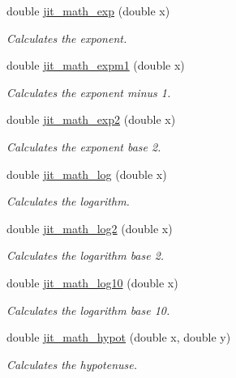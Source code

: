 \begin{DoxyCompactItemize}
double \hyperlink{group__mathmod_ga7bb1ea70eca67afe4c3f4d8581cf45cb}{jit\_\-math\_\-exp} (double x)
\begin{DoxyCompactList}\small\item\em Calculates the exponent. \item\end{DoxyCompactList}\item 
double \hyperlink{group__mathmod_ga580bb63b70c7d65e7bfe2c4125dadacb}{jit\_\-math\_\-expm1} (double x)
\begin{DoxyCompactList}\small\item\em Calculates the exponent minus 1. \item\end{DoxyCompactList}\item 
double \hyperlink{group__mathmod_gafc4e924e75bba7f486c72a1177accb89}{jit\_\-math\_\-exp2} (double x)
\begin{DoxyCompactList}\small\item\em Calculates the exponent base 2. \item\end{DoxyCompactList}\item 
double \hyperlink{group__mathmod_ga6543eb501e50e9b6d4c2f3ef4b22756d}{jit\_\-math\_\-log} (double x)
\begin{DoxyCompactList}\small\item\em Calculates the logarithm. \item\end{DoxyCompactList}\item 
double \hyperlink{group__mathmod_gaf5c2224b71ae0c70dbbf1f16b09ddf21}{jit\_\-math\_\-log2} (double x)
\begin{DoxyCompactList}\small\item\em Calculates the logarithm base 2. \item\end{DoxyCompactList}\item 
double \hyperlink{group__mathmod_ga6927a4753bd0f96341a17cca37e73f88}{jit\_\-math\_\-log10} (double x)
\begin{DoxyCompactList}\small\item\em Calculates the logarithm base 10. \item\end{DoxyCompactList}\item 
double \hyperlink{group__mathmod_ga52b4fbb8dfa64fd3758e22993e7476ca}{jit\_\-math\_\-hypot} (double x, double y)
\begin{DoxyCompactList}\small\item\em Calculates the hypotenuse. \item\end{DoxyCompactList}\item 

\end{DoxyCompactItemize}
